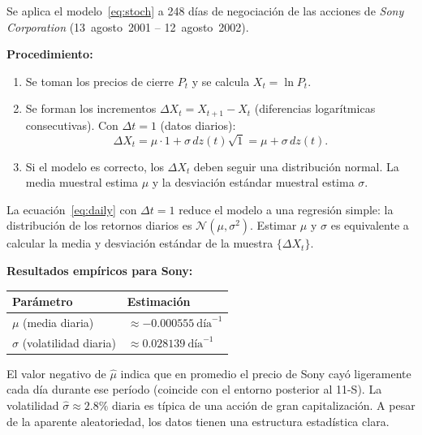 \documentclass[12pt]{article}
\begin{document}
Se aplica el modelo~\eqref{eq:stoch} a 248 d\'ias de negociaci\'on de las acciones
de \textit{Sony Corporation} (13~agosto~2001 -- 12~agosto~2002).

\textbf{Procedimiento:}
\begin{enumerate}
  \item Se toman los precios de cierre $P_t$ y se calcula $X_t = \ln P_t$.
  \item Se forman los incrementos $\Delta X_t = X_{t+1} - X_t$
        (diferencias logar\'itmicas consecutivas). Con $\Delta t = 1$ (datos diarios):
        \begin{equation}
          \Delta X_t = \mu \cdot 1 + \sigma\,dz(t)\sqrt{1} = \mu + \sigma\,dz(t).
          \label{eq:daily}
        \end{equation}
  \item Si el modelo es correcto, los $\Delta X_t$ deben seguir una distribuci\'on normal.
        La media muestral estima $\mu$ y la desviaci\'on est\'andar muestral estima $\sigma$.
\end{enumerate}

\begin{intuicionmat}
La ecuaci\'on~\eqref{eq:daily} con $\Delta t = 1$ reduce el modelo a una regresi\'on
simple: la distribuci\'on de los retornos diarios es $\mathcal{N}(\mu, \sigma^2)$.
Estimar $\mu$ y $\sigma$ es equivalente a calcular la media y desviaci\'on est\'andar
de la muestra $\{\Delta X_t\}$.
\end{intuicionmat}

\textbf{Resultados emp\'iricos para Sony:}
\begin{center}
\begin{tabular}{ll}
  \toprule
  Par\'ametro & Estimaci\'on \\
  \midrule
  $\mu$ (media diaria) & $\approx -0.000555\ \text{d\'ia}^{-1}$ \\
  $\sigma$ (volatilidad diaria) & $\approx 0.028139\ \text{d\'ia}^{-1}$ \\
  \bottomrule
\end{tabular}
\end{center}

\begin{intuicion}
El valor negativo de $\hat{\mu}$ indica que en promedio el precio de Sony cay\'o
ligeramente cada d\'ia durante ese per\'iodo (coincide con el entorno posterior
al 11-S). La volatilidad $\hat{\sigma} \approx 2.8\%$ diaria es t\'ipica de
una acci\'on de gran capitalizaci\'on. A pesar de la aparente aleatoriedad, los
datos tienen una estructura estad\'istica clara.
\end{intuicion}
\end{document}
